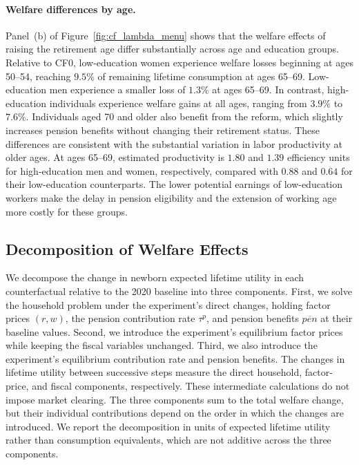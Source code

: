 \documentclass[12pt,a4paper]{article}
\begin{document}
\paragraph{Welfare differences by age.}
Panel~(b) of Figure~\ref{fig:cf_lambda_menu} shows that the welfare effects of raising the retirement age differ substantially across age and education groups. Relative to CF0, low-education women experience welfare losses beginning at ages 50--54, reaching $9.5\%$ of remaining lifetime consumption at ages 65--69. Low-education men experience a smaller loss of $1.3\%$ at ages 65--69. In contrast, high-education individuals experience welfare gains at all ages, ranging from $3.9\%$ to $7.6\%$. Individuals aged 70 and older also benefit from the reform, which slightly increases pension benefits without changing their retirement status. These differences are consistent with the substantial variation in labor productivity at older ages. At ages 65--69, estimated productivity is $1.80$ and $1.39$ efficiency units for high-education men and women, respectively, compared with $0.88$ and $0.64$ for their low-education counterparts. The lower potential earnings of low-education workers make the delay in pension eligibility and the extension of working age more costly for these groups.

\subsection{Decomposition of Welfare Effects}
\label{subsec:cf_decomposition}

We decompose the change in newborn expected lifetime utility in each counterfactual relative to the 2020 baseline into three components. First, we solve the household problem under the experiment's direct changes, holding factor prices $(r,w)$, the pension contribution rate $\tau^p$, and pension benefits $\overline{pen}$ at their baseline values. Second, we introduce the experiment's equilibrium factor prices while keeping the fiscal variables unchanged. Third, we also introduce the experiment's equilibrium contribution rate and pension benefits. The changes in lifetime utility between successive steps measure the direct household, factor-price, and fiscal components, respectively. These intermediate calculations do not impose market clearing. The three components sum to the total welfare change, but their individual contributions depend on the order in which the changes are introduced. We report the decomposition in units of expected lifetime utility rather than consumption equivalents, which are not additive across the three components.
\end{document}
